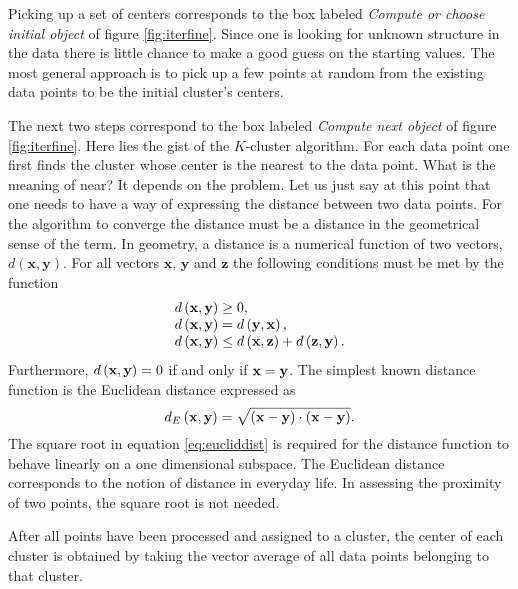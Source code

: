 { Picking up a set of centers
corresponds to the box labeled \textsl{Compute or choose initial
object} of figure \ref{fig:iterfine}. Since one is looking for
unknown structure in the data there is little chance to make a
good guess on the starting values. The most general approach is to
pick up a few points at random from the existing data points to be
the initial cluster's centers.

The next two steps correspond to the box labeled \textsl{Compute next
object} of figure \ref{fig:iterfine}. Here lies the gist of the
$K$-cluster algorithm. For each data point one first finds the
cluster whose center is the nearest to the data point. What is the
meaning of near? It depends on the problem. Let us just say at
this point that one needs to have a way of expressing the distance
between two data points. For the algorithm to converge the
distance must be a distance in the geometrical sense of the term.
In geometry, a distance is a numerical function of two vectors,
$d\left(\textbf{x},\textbf{y}\right)$. For all vectors $\textbf{x}$, $\textbf
{y}$ and $\textbf{z}$ the following conditions must be met by the
function
\begin{equation}
\nonumber
\begin{array}{l}
 d\left({\textbf x},{\textbf y}\right) \geq 0, \\
 d\left({\textbf x},{\textbf y}\right) = d\left({\textbf y},{\textbf x}\right), \\
 d\left({\textbf x},{\textbf y}\right) \leq d\left({\textbf x},{\textbf z}\right)
 + d\left({\textbf z},{\textbf y}\right).
\end{array}
\end{equation}
Furthermore, $d\left({\textbf x},{\textbf y}\right)=0$ if and only if
${\textbf x}={\textbf y}$. The simplest known distance function is the
Euclidean distance expressed as
\begin{equation}
\label{eq:eucliddist}
 d_E\left({\textbf x},{\textbf y}\right) = \sqrt{\left({\textbf x}-{\textbf y}\right)\cdot\left({\textbf x}-{\textbf
 y}\right)}.
\end{equation}
The square root in equation \ref{eq:eucliddist} is required for
the distance function to behave linearly on a one dimensional
subspace. The Euclidean distance corresponds to the notion of
distance in everyday life. In assessing the proximity of two
points, the square root is not needed.

After all points have been processed and assigned to a cluster,
the center of each cluster is obtained by taking the vector
average of all data points belonging to that cluster.

}
